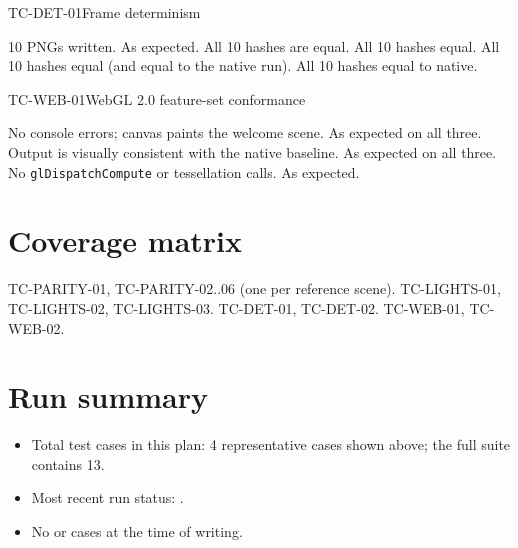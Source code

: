 \documentclass[11pt]{article}
\begin{document}
\begin{testcase}{TC-DET-01}{Frame determinism}
  \begin{teststeps}
          {10 PNGs written.}%
          {As expected.}{\Pass}
          {All 10 hashes are equal.}%
          {All 10 hashes equal.}{\Pass}
          {All 10 hashes equal (and equal to the native run).}%
          {All 10 hashes equal to native.}{\Pass}
  \end{teststeps}
\end{testcase}

\begin{testcase}{TC-WEB-01}{WebGL 2.0 feature-set conformance}
  \begin{teststeps}
          {No console errors; canvas paints the welcome scene.}%
          {As expected on all three.}{\Pass}
          {Output is visually consistent with the native baseline.}%
          {As expected on all three.}{\Pass}
          {No \texttt{glDispatchCompute} or tessellation calls.}%
          {As expected.}{\Pass}
  \end{teststeps}
\end{testcase}

\section{Coverage matrix}
\begin{coverage}
      {TC-PARITY-01, TC-PARITY-02..06 (one per reference scene).}
      {TC-LIGHTS-01, TC-LIGHTS-02, TC-LIGHTS-03.}
      {TC-DET-01, TC-DET-02.}
      {TC-WEB-01, TC-WEB-02.}
\end{coverage}

\section{Run summary}
\begin{itemize}
  \item Total test cases in this plan: 4 representative cases shown
        above; the full suite contains 13.
  \item Most recent run status: \Pass.
  \item No \Fail{} or \Block{} cases at the time of writing.
\end{itemize}
\end{document}
